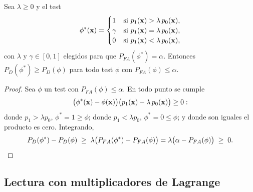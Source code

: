 \begin{teorema}
\label{teo:np}
Sea $\lambda \ge 0$ y el test
\begin{equation}
  \phi^*(\mathbf{x}) =
  \begin{cases}
    1 & \text{si } p_1(\mathbf{x}) > \lambda\,p_0(\mathbf{x}), \\
    \gamma & \text{si } p_1(\mathbf{x}) = \lambda\,p_0(\mathbf{x}), \\
    0 & \text{si } p_1(\mathbf{x}) < \lambda\,p_0(\mathbf{x}),
  \end{cases}
  \label{eq:np_test}
\end{equation}
con $\lambda$ y $\gamma \in [0,1]$ elegidos para que $P_{FA}(\phi^*) = \alpha$. Entonces $P_D(\phi^*) \ge P_D(\phi)$
para todo test $\phi$ con $P_{FA}(\phi) \le \alpha$.
\end{teorema}
\begin{proof}
Sea $\phi$ un test con $P_{FA}(\phi) \le \alpha$. En todo punto se cumple
\[
  \big(\phi^*(\mathbf{x}) - \phi(\mathbf{x})\big)\big(p_1(\mathbf{x}) - \lambda\,p_0(\mathbf{x})\big) \ge 0:
\]
donde $p_1 > \lambda p_0$, $\phi^* = 1 \ge \phi$; donde $p_1 < \lambda p_0$, $\phi^* = 0 \le \phi$; y donde son
iguales el producto es cero. Integrando,
\[
  P_D(\phi^*) - P_D(\phi) \;\ge\; \lambda\big(P_{FA}(\phi^*) - P_{FA}(\phi)\big) = \lambda\big(\alpha - P_{FA}(\phi)\big) \;\ge\; 0. \qedhere
\]
\end{proof}

\subsection{Lectura con multiplicadores de Lagrange}


